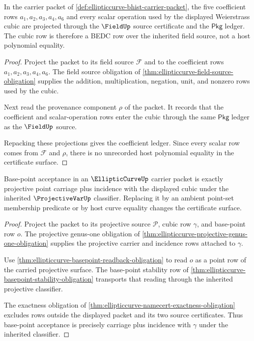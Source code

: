 \begin{theorem}
\label{thm:ellipticcurve-weierstrass-coefficient-ledger}
In the carrier packet of \autoref{def:ellipticcurve-bhist-carrier-packet}, the five coefficient rows $a_1,a_2,a_3,a_4,a_6$ and every scalar operation used by the displayed Weierstrass cubic are projected through the $\FieldUp$ source certificate and the $\mathsf{Pkg}$ ledger. The cubic row is therefore a BEDC row over the inherited field source, not a host polynomial equality.
\end{theorem}
\begin{proof}
Project the packet to its field source $\mathcal{F}$ and to the coefficient rows $a_1,a_2,a_3,a_4,a_6$. The field source obligation of \autoref{thm:ellipticcurve-field-source-obligation} supplies the addition, multiplication, negation, unit, and nonzero rows used by the cubic.

Next read the provenance component $\rho$ of the packet. It records that the coefficient and scalar-operation rows enter the cubic through the same $\mathsf{Pkg}$ ledger as the $\FieldUp$ source.

Repacking these projections gives the coefficient ledger. Since every scalar row comes from $\mathcal{F}$ and $\rho$, there is no unrecorded host polynomial equality in the certificate surface.
\end{proof}

\begin{theorem}
\label{thm:ellipticcurve-basepoint-incidence-exactness}
Base-point acceptance in an $\EllipticCurveUp$ carrier packet is exactly projective point carriage plus incidence with the displayed cubic under the inherited $\ProjectiveVarUp$ classifier. Replacing it by an ambient point-set membership predicate or by host curve equality changes the certificate surface.
\end{theorem}
\begin{proof}
Project the packet to its projective source $\mathcal{P}$, cubic row $\gamma$, and base-point row $o$. The projective genus-one obligation of \autoref{thm:ellipticcurve-projective-genus-one-obligation} supplies the projective carrier and incidence rows attached to $\gamma$.

Use \autoref{thm:ellipticcurve-basepoint-readback-obligation} to read $o$ as a point row of the carried projective surface. The base-point stability row of \autoref{thm:ellipticcurve-basepoint-stability-obligation} transports that reading through the inherited projective classifier.

The exactness obligation of \autoref{thm:ellipticcurve-namecert-exactness-obligation} excludes rows outside the displayed packet and its two source certificates. Thus base-point acceptance is precisely carriage plus incidence with $\gamma$ under the inherited classifier.
\end{proof}

